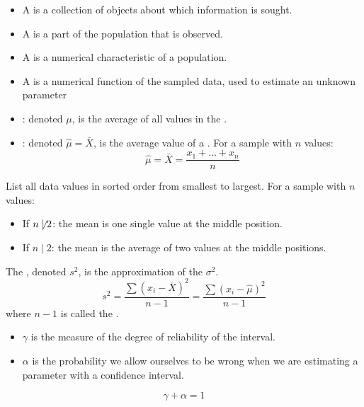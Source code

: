 \begin{multicols}{3}

      \begin{itemize}
        \item A  is a collection of objects about which information is sought.
        \item A  is a part of the population that is observed.
        \item A  is a numerical characteristic of a population.
        \item A  is a numerical function of the sampled data, used to estimate an unknown parameter
      \end{itemize}

      \begin{itemize}
      \item {}: denoted $\mu$, is the average of all values in the .
      \item {}: denoted $\hat{\mu} = \bar{X}$, is the average value of a . For a sample with $n$ values:
        \[
          \hat{\mu} = \bar{X} = \frac{x_1 + \ldots + x_n}{n}
        \]
      \end{itemize}

      \par List all data values in sorted order from smallest to largest. For a sample with $n$ values:
      \begin{itemize}
        \item If $n \not \mid 2$: the mean is one single value at the middle position.
        \item If $n \mid 2$: the mean is the average of two values at the middle positions.
      \end{itemize}

      \par The , denoted $s^2$, is the approximation of the  $\sigma^2$.
      \[
        s^2 = \frac{\sum (x_i - \bar{X})^2}{n - 1} = \frac{\sum (x_i - \hat{\mu})^2}{n - 1}
      \]
      where $n - 1$ is called the .

      \begin{itemize}
        \item {} $\gamma$ is the measure of the degree of reliability of the interval.
        \item {} $\alpha$ is the probability we allow ourselves to be wrong when we are estimating a parameter with a confidence interval.
      \end{itemize}
      \[
        \gamma + \alpha = 1
      \]


\end{multicols}
